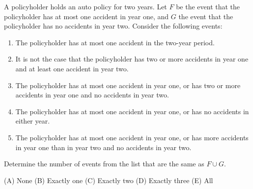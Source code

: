 \begin{example}
A policyholder holds an auto policy for two years. Let $F$ be the event that the
policyholder has at most one accident in year one, and $G$ the event that the
policyholder has no accidents in year two. Consider the following events:
\begin{enumerate}[nosep,label=(\roman*)]
  \item The policyholder has at most one accident in the two-year period.
  \item It is not the case that the policyholder has two or more accidents in year
        one and at least one accident in year two.
  \item The policyholder has at most one accident in year one, or has two or more
        accidents in year one and no accidents in year two.
  \item The policyholder has at most one accident in year one, or has no accidents
        in either year.
  \item The policyholder has at most one accident in year one, or has more
        accidents in year one than in year two and no accidents in year two.
\end{enumerate}
Determine the number of events from the list that are the same as $F \cup G$.

(A) None \qquad (B) Exactly one \qquad (C) Exactly two \qquad (D) Exactly three \qquad (E) All
\end{example}
